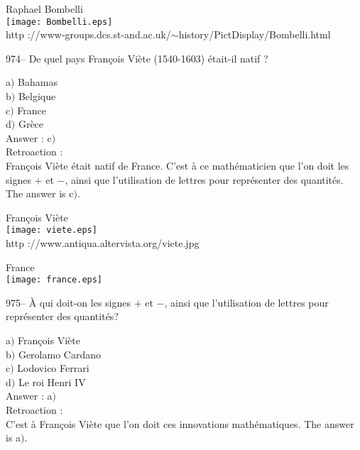 ﻿\documentclass[letterpaper, 12pt]{article}
\begin{document}
        \begin{center}
        Raphael Bombelli\\
    \texttt{[image: Bombelli.eps]}\\
        {\footnotesize http
://www-groups.dcs.st-and.ac.uk/$\sim$history/PictDisplay/Bombelli.html}
    \end{center}

974-- De quel pays Fran\c cois Vi\`ete (1540-1603) \'etait-il natif
?

a$)$ Bahamas \\
b$)$ Belgique  \\
c$)$ France  \\
d$)$ Gr\`ece\\

Answer : c$)$\\

Retroaction : \\
Fran\c cois Vi\`ete \'etait natif de France. C'est \`a ce
math\'ematicien que l'on doit les signes $+$ et $-$, ainsi que
l'utilisation de lettres
pour repr\'esenter des quantit\'es. The answer is c$)$.\\

        \begin{center}
        Fran\c cois Vi\`ete\\
    \texttt{[image: viete.eps]}\\
        {\footnotesize http ://www.antiqua.altervista.org/viete.jpg}
    \end{center}

        \begin{center}
        France\\
    \texttt{[image: france.eps]}\\
    \end{center}

975-- \`A qui doit-on les signes $+$ et $-$, ainsi que l'utilisation
de lettres pour repr\'esenter des quantit\'es?

a$)$ Fran\c cois Vi\`ete \\
b$)$ Gerolamo Cardano  \\
c$)$ Lodovico Ferrari  \\
d$)$ Le roi Henri IV\\

Answer : a$)$\\

Retroaction : \\
C'est \`a Fran\c cois Vi\`ete que l'on doit ces innovations
math\'ematiques. The answer is a$)$.
\end{document}
